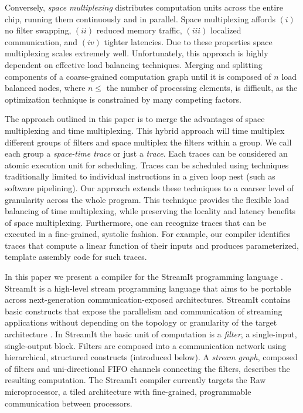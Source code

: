 Conversely, {\it space multiplexing} distributes computation units
across the entire chip, running them continuously and in parallel.
Space multiplexing affords $(i)$ no filter swapping, $(ii)$ reduced
memory traffic, $(iii)$ localized communication, and $(iv)$ tighter
latencies.  Due to these properties space multiplexing scales
extremely well.  Unfortunately, this approach is highly dependent on
effective load balancing techniques.  Merging and splitting components
of a coarse-grained computation graph until it is composed of $n$ load
balanced nodes, where $n \le$ the number of processing elements, is
difficult, as the optimization technique is constrained by many
competing factors.

The approach outlined in this paper is to merge the advantages of
space multiplexing and time multiplexing.  This hybrid approach will
time multiplex different groups of filters and space multiplex the
filters within a group.  We call each group a {\it space-time trace}
or just a {\it trace}. Each traces can be considered an atomic
execution unit for scheduling.  Traces can be scheduled using
techniques traditionally limited to individual instructions in a given
loop nest (such as software pipelining). Our approach extends these
techniques to a coarser level of granularity across the whole program.
This technique provides the flexible load balancing of time
multiplexing, while preserving the locality and latency benefits of
space multiplexing.  Furthermore, one can recognize traces that can be
executed in a fine-grained, systolic fashion.  For example, our
compiler identifies traces that compute a linear function of their
inputs and produces parameterized, template assembly code for such
traces.

In this paper we present a compiler for the StreamIt programming
language \cite{streamitcc}.  StreamIt is a high-level stream
programming language that aims to be portable across next-generation
communication-exposed architectures.  StreamIt contains basic
constructs that expose the parallelism and communication of streaming
applications without depending on the topology or granularity of the
target architecture \cite{streamit-asplos}. In StreamIt the basic unit
of computation is a {\it filter}, a single-input, single-output block.
Filters are composed into a communication network using hierarchical,
structured constructs (introduced below).  A {\it stream graph},
composed of filters and uni-directional FIFO channels connecting the
filters, describes the resulting computation. The StreamIt compiler
currently targets the Raw microprocessor, a tiled architecture with
fine-grained, programmable communication between processors.

